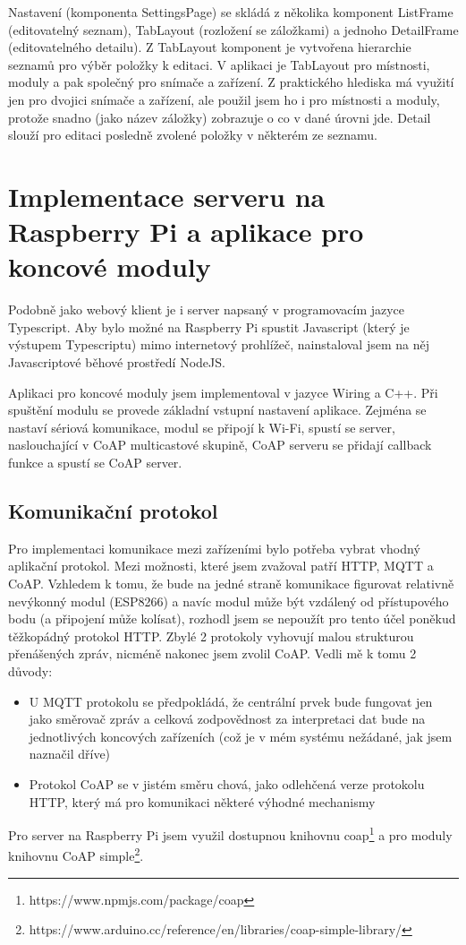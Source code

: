 Nastavení (komponenta SettingsPage) se skládá z několika komponent ListFrame (editovatelný seznam), TabLayout (rozložení se záložkami) a jednoho DetailFrame (editovatelného detailu). Z TabLayout komponent je vytvořena hierarchie seznamů pro výběr položky k editaci. V aplikaci je TabLayout pro místnosti, moduly a pak společný pro snímače a zařízení. Z praktického hlediska má využití jen pro dvojici snímače a zařízení, ale použil jsem ho i pro místnosti a moduly, protože snadno (jako název záložky) zobrazuje o co v dané úrovni jde.
Detail slouží pro editaci posledně zvolené položky v některém ze seznamu.



\section{Implementace serveru na Raspberry Pi a aplikace pro koncové moduly}
Podobně jako webový klient je i server napsaný v programovacím jazyce Typescript. Aby bylo možné na Raspberry Pi spustit Javascript (který je výstupem Typescriptu) mimo internetový prohlížeč, nainstaloval jsem na něj Javascriptové běhové prostředí NodeJS.

Aplikaci pro koncové moduly jsem implementoval v jazyce Wiring a C++. Při spuštění modulu se provede základní vstupní nastavení aplikace. Zejména se nastaví sériová komunikace, modul se připojí k Wi-Fi, spustí se server, naslouchající v CoAP multicastové skupině, CoAP serveru se přidají callback funkce a spustí se CoAP server.



\subsection*{Komunikační protokol}
Pro implementaci komunikace mezi zařízeními bylo potřeba vybrat vhodný aplikační protokol. Mezi možnosti, které jsem zvažoval patří HTTP, MQTT a CoAP. 
Vzhledem k tomu, že bude na jedné straně komunikace figurovat relativně nevýkonný modul (ESP8266) a navíc modul může být vzdálený od přístupového bodu (a připojení může kolísat), rozhodl jsem se nepoužít pro tento účel poněkud těžkopádný protokol HTTP. Zbylé 2 protokoly vyhovují malou strukturou přenášených zpráv, nicméně nakonec jsem zvolil CoAP. Vedli mě k tomu 2 důvody:

\begin{itemize}
    \item U MQTT protokolu se předpokládá, že centrální prvek bude fungovat jen jako směrovač zpráv a celková zodpovědnost za interpretaci dat bude na jednotlivých koncových zařízeních (což je v mém systému nežádané, jak jsem naznačil dříve)
    \item Protokol CoAP se v jistém směru chová, jako odlehčená verze protokolu HTTP, který má pro komunikaci některé výhodné mechanismy
\end{itemize}
Pro server na Raspberry Pi jsem využil dostupnou knihovnu coap\footnote{https://www.npmjs.com/package/coap} a pro moduly knihovnu CoAP simple\footnote{https://www.arduino.cc/reference/en/libraries/coap-simple-library/}.

